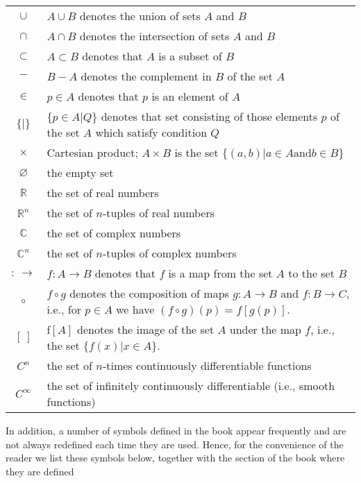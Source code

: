 \begin{table}[!ht]
    \centering
\begin{tabularx}{\textwidth}{c X}
    \toprule
    $\cup$ & $A\cup B$ denotes the union of sets $A$ and $B$\\
    $\cap$ & $A\cap B$ denotes the intersection of sets $A$ and $B$\\
    $\subset$ & $A\subset B$ denotes that $A$ is a subset of $B$\\
    $-$ & $B-A$ denotes the complement in $B$ of the set $A$\\
    $\in$ & $p\in A$ denotes that $p$ is an element of $A$\\
    $\{|\}$ & $\{p\in A|Q\}$ denotes that set consisting of those elements $p$ of the set $A$ which satisfy condition $Q$\\
    $\times$ & Cartesian product; $A\times B$ is the set $\{(a,b)|a\in A \text{and} b\in B\}$\\
    $\varnothing$ & the empty set\\
    $\mathbb{R}$ & the set of real numbers\\
    $\mathbb{R}^n$ & the set of $n$-tuples of real numbers\\
    $\mathbb{C}$ & the set of complex numbers\\
    $\mathbb{C}^n$ & the set of $n$-tuples of complex numbers\\
    $:\ \to$ & $f:A\to B$ denotes that $f$ is a map from the set $A$ to the set $B$\\
    $\circ$ & $f\circ g$ denotes the composition of maps $g:A\to B$ and $f:B\to C$, i.e., for $p\in A$ we have $(f\circ g)(p)=f[g(p)]$.\\
    $[\ ]$ & f$[A]$ denotes the image of the set $A$ under the map $f$, i.e., the set $\{f(x)|x\in A\}$.\\
    $C^n$ & the set of $n$-times continuously differentiable functions\\
    $C^\infty$ & the set of infinitely continuously differentiable (i.e., smooth functions)\\
    \bottomrule
\end{tabularx}
\end{table}

In addition, a number of symbols defined in the book appear frequently and are not always redefined each time they are used. Hence, for the convenience of the reader we list these symbols below, together with the section of the book where they are defined

